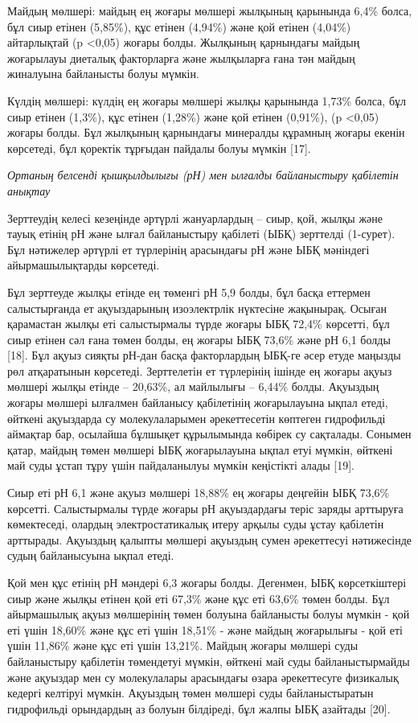 \begin{multicols}{2}
Майдың мөлшері: майдың ең жоғары мөлшері жылқының қарынында 6,4\% болса,
бұл сиыр етінен (5,85\%), құс етінен (4,94\%) және қой етінен (4,04\%)
айтарлықтай (p \textless0,05) жоғары болды. Жылқының қарнындағы майдың
жоғарылауы диеталық факторларға және жылқыларға ғана тән майдың
жиналуына байланысты болуы мүмкін.

Күлдің мөлшері: күлдің ең жоғары мөлшері жылқы қарынында 1,73\% болса,
бұл сиыр етінен (1,3\%), құс етінен (1,28\%) және қой етінен (0,91\%),
(p \textless0,05) жоғары болды. Бұл жылқының қарнындағы минералды
құрамның жоғары екенін көрсетеді, бұл қоректік тұрғыдан пайдалы болуы
мүмкін {[}17{]}.

\emph{Ортаның белсенді қышқылдылығы (рН) мен ылғалды байланыстыру
қабілетін анықтау}

Зерттеудің келесі кезеңінде әртүрлі жануарлардың -- сиыр, қой, жылқы
және тауық етінің рН және ылғал байланыстыру қабілеті (ЫБҚ) зерттелді
(1-сурет). Бұл нәтижелер әртүрлі ет түрлерінің арасындағы рН және ЫБҚ
мәніндегі айырмашылықтарды көрсетеді.

Бұл зерттеуде жылқы етінде ең төменгі рН 5,9 болды, бұл басқа еттермен
салыстырғанда ет ақуыздарының изоэлектрлік нүктесіне жақынырақ. Осыған
қарамастан жылқы еті салыстырмалы түрде жоғары ЫБҚ 72,4\% көрсетті, бұл
сиыр етінен сәл ғана төмен болды, ең жоғары ЫБҚ 73,6\% және рН 6,1 болды
{[}18{]}. Бұл ақуыз сияқты рН-дан басқа факторлардың ЫБҚ-ге әсер етуде
маңызды рөл атқаратынын көрсетеді. Зерттелетін ет түрлерінің ішінде ең
жоғары ақуыз мөлшері жылқы етінде -- 20,63\%, ал майлылығы -- 6,44\%
болды. Ақуыздың жоғары мөлшері ылғалмен байланысу қабілетінің
жоғарылауына ықпал етеді, өйткені ақуыздарда су молекулаларымен
әрекеттесетін көптеген гидрофильді аймақтар бар, осылайша бұлшықет
құрылымында көбірек су сақталады. Сонымен қатар, майдың төмен мөлшері
ЫБҚ жоғарылауына ықпал етуі мүмкін, өйткені май суды ұстап тұру үшін
пайдаланылуы мүмкін кеңістікті алады {[}19{]}.

Сиыр еті рН 6,1 және ақуыз мөлшері 18,88\% ең жоғары деңгейін ЫБҚ 73,6\%
көрсетті. Салыстырмалы түрде жоғары рН ақуыздардағы теріс заряды
арттыруға көмектеседі, олардың электростатикалық итеру арқылы суды ұстау
қабілетін арттырады. Ақуыздың қалыпты мөлшері ақуыздың сумен әрекеттесуі
нәтижесінде судың байланысуына ықпал етеді.

Қой мен құс етінің рН мәндері 6,3 жоғары болды. Дегенмен, ЫБҚ
көрсеткіштері сиыр және жылқы етінен қой еті 67,3\% және құс еті 63,6\%
төмен болды. Бұл айырмашылық ақуыз мөлшерінің төмен болуына байланысты
болуы мүмкін - қой еті үшін 18,60\% және құс еті үшін 18,51\% - және
майдың жоғарылығы - қой еті үшін 11,86\% және құс еті үшін 13,21\%.
Майдың жоғары мөлшері суды байланыстыру қабілетін төмендетуі мүмкін,
өйткені май суды байланыстырмайды және ақуыздар мен су молекулалары
арасындағы өзара әрекеттесуге физикалық кедергі келтіруі мүмкін.
Ақуыздың төмен мөлшері суды байланыстыратын гидрофильді орындардың аз
болуын білдіреді, бұл жалпы ЫБҚ азайтады {[}20{]}.
\end{multicols}

